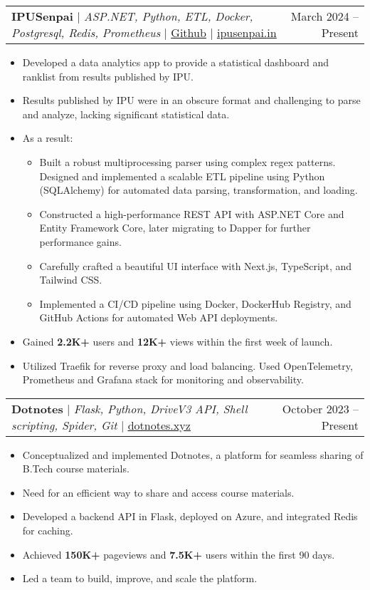 \documentclass[letterpaper,11pt]{article}
\makeatletter
\newcommand{\resumeItem}[1]{
  \item\small{
    {#1 \vspace{-2pt}}
  }
}
\newcommand{\resumeProjectHeading}[2]{
    \item
    \begin{tabular*}{0.97\textwidth}{l@{\extracolsep{\fill}}r}
      \small#1 & #2 \\
    \end{tabular*}\vspace{-7pt}
}
\newcommand{\resumeItemListStart}{\begin{itemize}}
\newcommand{\resumeItemListEnd}{\end{itemize}\vspace{-5pt}}
\makeatother
\begin{document}
      \resumeProjectHeading
          {\textbf{IPUSenpai} $|$ \emph{ASP.NET, Python, ETL, Docker, Postgresql, Redis, Prometheus} $|$ \href{https://github.com/martian0x80/IPUSenpaiBackend}{\color{blue}\underline{Github}} $|$ \href{https://devel.ipusenpai.in}{\color{blue}\underline{ipusenpai.in}}}{March 2024 -- Present}
          \resumeItemListStart
            \resumeItem{Developed a data analytics app to provide a statistical dashboard and ranklist from results published by IPU.}
            \resumeItem{Results published by IPU were in an obscure format and challenging to parse and analyze, lacking significant statistical data.}
            \resumeItem{As a result:
              \begin{itemize}
                \item Built a robust multiprocessing parser using complex regex patterns. Designed and implemented a scalable ETL pipeline using Python (SQLAlchemy) for automated data parsing, transformation, and loading.
                \item Constructed a high-performance REST API with ASP.NET Core and Entity Framework Core, later migrating to Dapper for further performance gains.
                \item Carefully crafted a beautiful UI interface with Next.js, TypeScript, and Tailwind CSS.
                \item Implemented a CI/CD pipeline using Docker, DockerHub Registry, and GitHub Actions for automated Web API deployments.
              \end{itemize}
            }
            \resumeItem{Gained \textbf{2.2K+} users and \textbf{12K+} views within the first week of launch.}
            \resumeItem{Utilized Traefik for reverse proxy and load balancing. Used OpenTelemetry, Prometheus and Grafana stack for monitoring and observability.}
          \resumeItemListEnd
      
      \resumeProjectHeading
          {\textbf{Dotnotes} $|$ \emph{Flask, Python, DriveV3 API, Shell scripting, Spider, Git} $|$ \href{https://www.dotnotes.xyz/}{\color{blue}\underline{dotnotes.xyz}}}{October 2023 -- Present}
          \resumeItemListStart
            \resumeItem{Conceptualized and implemented Dotnotes, a platform for seamless sharing of B.Tech course materials.}
            \resumeItem{Need for an efficient way to share and access course materials.}
            \resumeItem{Developed a backend API in Flask, deployed on Azure, and integrated Redis for caching.}
            \resumeItem{Achieved \textbf{150K+} pageviews and \textbf{7.5K+} users within the first 90 days.}
            \resumeItem{Led a team to build, improve, and scale the platform.}
          \resumeItemListEnd
\end{document}
